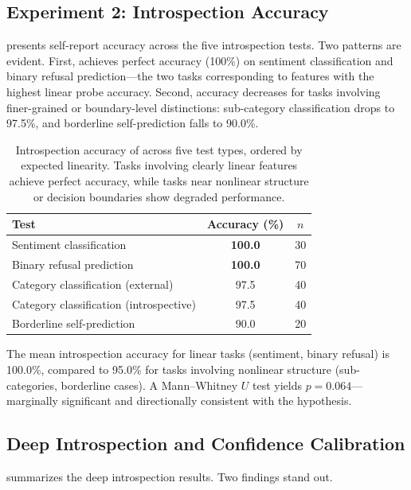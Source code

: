\subsection{Experiment 2: Introspection Accuracy}

 presents self-report accuracy across the five introspection tests. Two patterns are evident. First, \gptfour achieves perfect accuracy (100\%) on sentiment classification and binary refusal prediction---the two tasks corresponding to features with the highest linear probe accuracy. Second, accuracy decreases for tasks involving finer-grained or boundary-level distinctions: sub-category classification drops to 97.5\%, and borderline self-prediction falls to 90.0\%.

\begin{table}[t]
    \centering
    \caption{Introspection accuracy of \gptfour across five test types, ordered by expected linearity. Tasks involving clearly linear features achieve perfect accuracy, while tasks near nonlinear structure or decision boundaries show degraded performance.}
    \begin{tabular}{@{}lcc@{}}
        \toprule
        Test & Accuracy (\%) & $n$ \\
        \midrule
        Sentiment classification & \textbf{100.0} & 30 \\
        Binary refusal prediction & \textbf{100.0} & 70 \\
        Category classification (external) & 97.5 & 40 \\
        Category classification (introspective) & 97.5 & 40 \\
        Borderline self-prediction & 90.0 & 20 \\
        \bottomrule
    \end{tabular}
    \label{tab:introspection}
\end{table}

The mean introspection accuracy for linear tasks (sentiment, binary refusal) is 100.0\%, compared to 95.0\% for tasks involving nonlinear structure (sub-categories, borderline cases). A Mann--Whitney $U$ test yields $p = 0.064$---marginally significant and directionally consistent with the hypothesis.

\subsection{Deep Introspection and Confidence Calibration}

 summarizes the deep introspection results. Two findings stand out.

